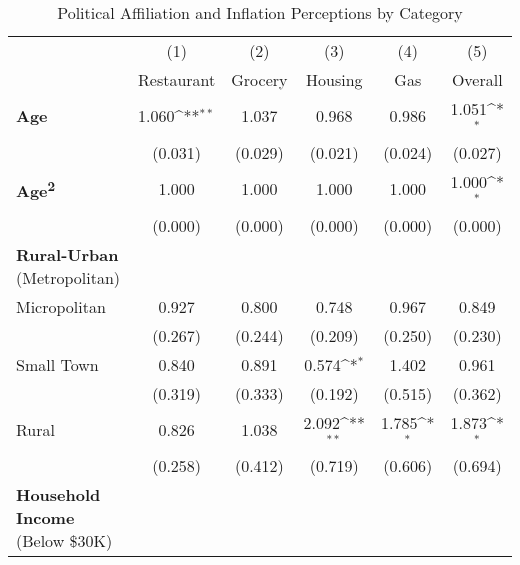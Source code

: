 \begin{table}[htbp]\centering \scriptsize
\label{tab:pol}
\def\sym#1{\ifmmode^{#1}\else\(^{#1}\)\fi}
\caption{Political Affiliation and Inflation Perceptions by Category}
\begin{tabular}{l*{5}{c}}
\hline\hline
                    &\multicolumn{1}{c}{(1)}&\multicolumn{1}{c}{(2)}&\multicolumn{1}{c}{(3)}&\multicolumn{1}{c}{(4)}&\multicolumn{1}{c}{(5)}\\
                    &\multicolumn{1}{c}{Restaurant}&\multicolumn{1}{c}{Grocery}&\multicolumn{1}{c}{Housing}&\multicolumn{1}{c}{Gas}&\multicolumn{1}{c}{Overall}\\
\hline
\textbf{Age}        &       1.060\sym{**} &       1.037         &       0.968         &       0.986         &       1.051\sym{*}  \\
                    &     (0.031)         &     (0.029)         &     (0.021)         &     (0.024)         &     (0.027)         \\
\textbf{Age\textsuperscript{2}}&       1.000         &       1.000         &       1.000         &       1.000         &       1.000\sym{*}  \\
                    &     (0.000)         &     (0.000)         &     (0.000)         &     (0.000)         &     (0.000)         \\
\textbf{Rural-Urban} (Metropolitan) &  &  &  &   & \\
Micropolitan        &       0.927         &       0.800         &       0.748         &       0.967         &       0.849         \\
                    &     (0.267)         &     (0.244)         &     (0.209)         &     (0.250)         &     (0.230)         \\
Small Town          &       0.840         &       0.891         &       0.574\sym{*}  &       1.402         &       0.961         \\
                    &     (0.319)         &     (0.333)         &     (0.192)         &     (0.515)         &     (0.362)         \\
Rural               &       0.826         &       1.038         &       2.092\sym{**} &       1.785\sym{*}  &       1.873\sym{*}  \\
                    &     (0.258)         &     (0.412)         &     (0.719)         &     (0.606)         &     (0.694)         \\
\textbf{Household Income} (Below \$30K) &  &  &  &   & \\

\end{tabular}
\end{table}
